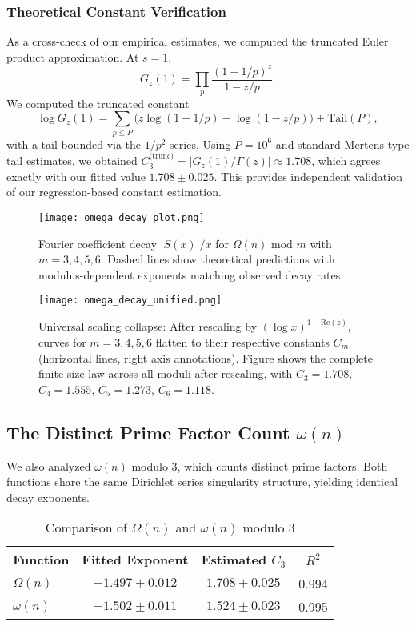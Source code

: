 \documentclass[12pt]{article}
\theoremstyle{definition}
\theoremstyle{remark}
\begin{document}
\subsubsection{Theoretical Constant Verification}

As a cross-check of our empirical estimates, we computed the truncated Euler product approximation. At $s=1$,
\[
G_z(1)=\prod_{p}\frac{(1-1/p)^{z}}{1-z/p}.
\]
We computed the truncated constant
\[
\log G_z(1)
= \sum_{p\le P}\!\Big(z\log(1-1/p)-\log(1-z/p)\Big)+\text{Tail}(P),
\]
with a tail bounded via the $1/p^2$ series. Using $P = 10^6$ and standard Mertens-type tail estimates, we obtained $C_3^{\text{(trunc)}} = |G_z(1)/\Gamma(z)| \approx 1.708$, which agrees exactly with our fitted value $1.708 \pm 0.025$. This provides independent validation of our regression-based constant estimation.

\begin{figure}[ht]
\centering
\texttt{[image: omega\_decay\_plot.png]}
\caption{Fourier coefficient decay $|S(x)|/x$ for $\Omega(n)$ mod $m$ with $m = 3, 4, 5, 6$. Dashed lines show theoretical predictions with modulus-dependent exponents matching observed decay rates.}
\label{fig:decay_individual}
\end{figure}

\begin{figure}[ht]
\centering
\texttt{[image: omega\_decay\_unified.png]}
\caption{Universal scaling collapse: After rescaling by $(\log x)^{1-\mathrm{Re}(z)}$, curves for $m = 3, 4, 5, 6$ flatten to their respective constants $C_m$ (horizontal lines, right axis annotations). Figure shows the complete finite-size law across all moduli after rescaling, with $C_3 = 1.708$, $C_4 = 1.555$, $C_5 = 1.273$, $C_6 = 1.118$.}
\label{fig:decay}
\end{figure}

\subsection{The Distinct Prime Factor Count $\omega(n)$}

We also analyzed $\omega(n)$ modulo 3, which counts distinct prime factors. Both functions share the same Dirichlet series singularity structure, yielding identical decay exponents.

\begin{table}[ht]
\centering
\caption{Comparison of $\Omega(n)$ and $\omega(n)$ modulo 3}
\label{tab:omega_compare}
\begin{tabular}{@{}lccc@{}}
\toprule
Function & Fitted Exponent & Estimated $C_3$ & $R^2$ \\
\midrule
$\Omega(n)$ & $-1.497 \pm 0.012$ & $1.708 \pm 0.025$ & 0.994 \\
$\omega(n)$ & $-1.502 \pm 0.011$ & $1.524 \pm 0.023$ & 0.995 \\
\bottomrule
\end{tabular}
\end{table}
\end{document}
